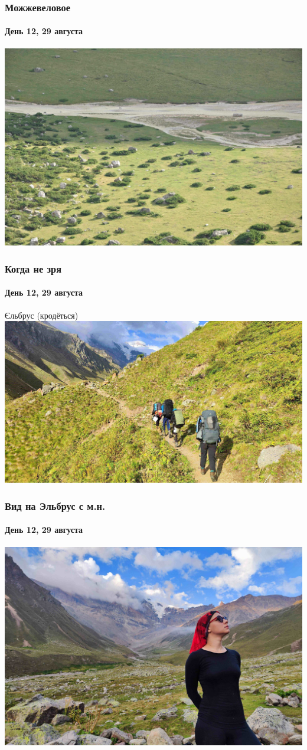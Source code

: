 \begin{frame}
	\frametitle{Можжевеловое}
	\framesubtitle{День 12, 29 августа}	
	\centering
	\includegraphics[width=\textwidth]{../pics/DSC_0471 2}			
\end{frame}

\begin{frame}
	\frametitle{Когда не зря}
	\framesubtitle{День 12, 29 августа}	
	\footnotesize Єльбрус (кродёться)
	\centering
	\includegraphics[width=\textwidth]{../pics/IMG_20240829_170756}			
\end{frame}

\begin{frame}
	\frametitle{Вид на Эльбрус с м.н.}
	\framesubtitle{День 12, 29 августа}	
	\centering
	\includegraphics[width=\textwidth]{../pics/IMG_20240829_181353}			
\end{frame}

